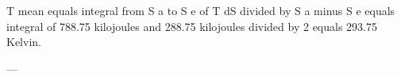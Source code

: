 T mean equals integral from S a to S e of T dS divided by S a minus S e equals integral of 788.75 kilojoules and 288.75 kilojoules divided by 2 equals 293.75 Kelvin.  

---